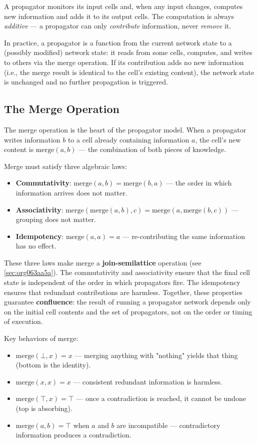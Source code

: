 \documentclass[11pt]{article}
\begin{document}
A propagator monitors its input cells and, when any input changes,
computes new information and adds it to its output cells. The
computation is always \emph{additive} --- a propagator can only \emph{contribute}
information, never \emph{remove} it.

In practice, a propagator is a function from the current network state to
a (possibly modified) network state: it reads from some cells, computes,
and writes to others via the merge operation. If its contribution adds
no new information (i.e., the merge result is identical to the cell's
existing content), the network state is unchanged and no further
propagation is triggered.
\subsection{The Merge Operation}
\label{sec:orgc826b69}

The merge operation is the heart of the propagator model. When a
propagator writes information \(b\) to a cell already containing
information \(a\), the cell's new content is \(\text{merge}(a, b)\) --- the
combination of both pieces of knowledge.

Merge must satisfy three algebraic laws:

\begin{itemize}
\item \textbf{Commutativity}: \(\text{merge}(a, b) = \text{merge}(b, a)\)
--- the order in which information arrives does not matter.
\item \textbf{Associativity}: \(\text{merge}(\text{merge}(a, b), c) = \text{merge}(a, \text{merge}(b, c))\)
--- grouping does not matter.
\item \textbf{Idempotency}: \(\text{merge}(a, a) = a\)
--- re-contributing the same information has no effect.
\end{itemize}

These three laws make merge a \textbf{join-semilattice} operation (see
\ref{sec:org063aa5a}). The commutativity and associativity
ensure that the final cell state is independent of the order in which
propagators fire. The idempotency ensures that redundant contributions
are harmless. Together, these properties guarantee \textbf{confluence}: the
result of running a propagator network depends only on the initial cell
contents and the set of propagators, not on the order or timing of
execution.

Key behaviors of merge:

\begin{itemize}
\item \(\text{merge}(\bot, x) = x\) --- merging anything with "nothing" yields
that thing (bottom is the identity).
\item \(\text{merge}(x, x) = x\) --- consistent redundant information is
harmless.
\item \(\text{merge}(\top, x) = \top\) --- once a contradiction is reached, it
cannot be undone (top is absorbing).
\item \(\text{merge}(a, b) = \top\) when \(a\) and \(b\) are incompatible ---
contradictory information produces a contradiction.
\end{itemize}
\end{document}
